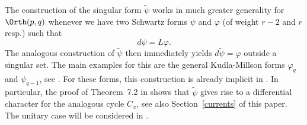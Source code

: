 \begin{remark}
The construction of the singular form $\tilde{\psi}$ works in much greater generality for $\Orth(p,q)$ whenever we have two Schwartz forms $\psi$ and $\varphi$ (of weight $r-2$ and $r$ resp.) such that 
\[
d \psi = L \varphi.
\]
The analogous construction of $\tilde{\psi}$ then immediately yields $d \tilde{\psi} = \varphi$ outside a singular set. The main examples for this are the general Kudla-Millson forms $\varphi_{q}$ and $\psi_{q-1}$, see \cite{KM90}. For these forms, this construction is already implicit in \cite{BFDuke}. In particular, the proof of Theorem~7.2 in \cite{BFDuke} shows that $\tilde{\psi}$ gives rise to a differential character for the analogous cycle $C_x$, see also Section~\ref{currents} of this paper. The unitary case will be considered in \cite{F-unitary}. 
\end{remark}


